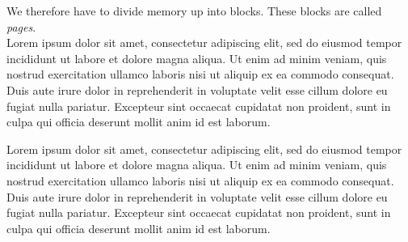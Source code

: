 We therefore have to divide memory up into blocks. These blocks are called
\emph{pages}.\\

Lorem ipsum dolor sit amet, consectetur adipiscing elit, sed do eiusmod tempor
incididunt ut labore et dolore magna aliqua. Ut enim ad minim veniam, quis
nostrud exercitation ullamco laboris nisi ut aliquip ex ea commodo
consequat. Duis aute irure dolor in reprehenderit in voluptate velit esse cillum
dolore eu fugiat nulla pariatur. Excepteur sint occaecat cupidatat non proident,
sunt in culpa qui officia deserunt mollit anim id est laborum.



Lorem ipsum dolor sit amet, consectetur adipiscing elit, sed do eiusmod tempor
incididunt ut labore et dolore magna aliqua. Ut enim ad minim veniam, quis
nostrud exercitation ullamco laboris nisi ut aliquip ex ea commodo
consequat. Duis aute irure dolor in reprehenderit in voluptate velit esse cillum
dolore eu fugiat nulla pariatur. Excepteur sint occaecat cupidatat non proident,
sunt in culpa qui officia deserunt mollit anim id est laborum.
